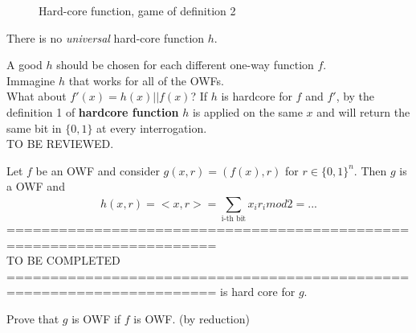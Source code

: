 \begin{figure}[h!]
   \centering
   \sdinit{}
   \caption{Hard-core function, game of definition 2}
   \label{fig:def2hcf}
\end{figure}

\begin{clm}
    There is no \textit{universal} hard-core function $h$.
\end{clm}
A good $h$ should be chosen for each different one-way function $f$.\\
Immagine $h$ that works for all of the OWFs.\\
What about $f'(x)=h(x)||f(x)$? If $h$ is hardcore for $f$ and $f'$, by the
definition 1 of \textbf{hardcore function} $h$ is applied on the same $x$ and
will return the same bit in $\{0,1\}$ at every interrogation.\\
TO BE REVIEWED.

\begin{theorem}
    Let $f$ be an OWF and consider $g(x,r)=(f(x), r)$ for $r \in \{0,1\}^{n}$.
    Then $g$ is a OWF and 
    \[ h(x,r)=<x,r>= \sum_{\text{i-th bit}}^{}x_{i}r_{i} mod2 = ...\]
    ======================================================================\\
    TO BE COMPLETED\\
    ======================================================================
    is hard core for $g$.
\end{theorem}

\begin{exercise}
    Prove that $g$ is OWF if $f$ is OWF. (by reduction)
\end{exercise}

